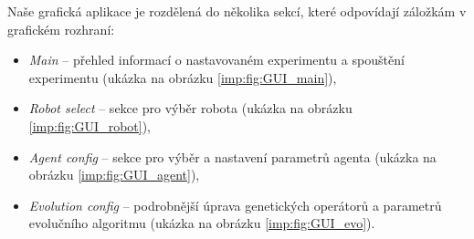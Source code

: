 Naše grafická aplikace je rozdělená do několika sekcí, které odpovídají
záložkám v grafickém rozhraní:

\begin{itemize}
    \item \emph{Main} -- přehled informací o nastavovaném experimentu a
        spouštění experimentu (ukázka na obrázku \ref{imp:fig:GUI_main}),
    \item \emph{Robot select} -- sekce pro výběr robota (ukázka na obrázku
        \ref{imp:fig:GUI_robot}),
    \item \emph{Agent config} -- sekce pro výběr a nastavení parametrů agenta
        (ukázka na obrázku \ref{imp:fig:GUI_agent}),
    \item \emph{Evolution config} -- podrobnější úprava genetických operátorů a
        parametrů evolučního algoritmu (ukázka na obrázku \ref{imp:fig:GUI_evo}).
\end{itemize}


